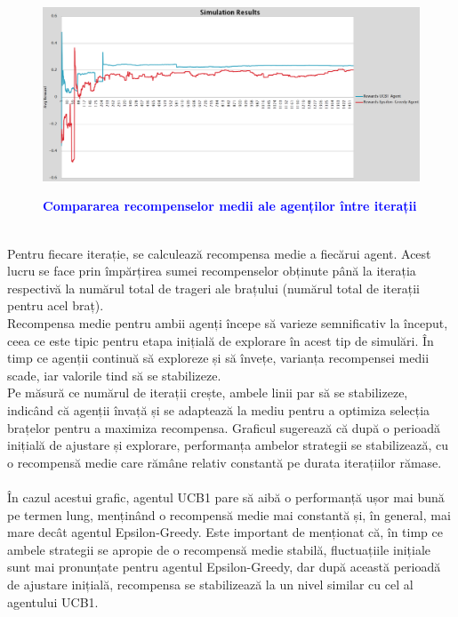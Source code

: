 \documentclass{article}
\begin{document}
\begin{figure}[h]
    \centering
    \includegraphics[width=1\linewidth]{simulation results.png}
    \bfseries\caption{\textbf{\textcolor{blue}{Compararea recompenselor medii ale agenților între iterații}}}
\end{figure}
\\Pentru fiecare iterație, se calculează recompensa medie a fiecărui agent. Acest lucru se face prin împărțirea sumei recompenselor obținute până la iterația respectivă la numărul total de trageri ale brațului (numărul total de iterații pentru acel braț).\\
Recompensa medie pentru ambii agenți începe să varieze semnificativ la început, ceea ce este tipic pentru etapa inițială de explorare în acest tip de simulări. În timp ce agenții continuă să exploreze și să învețe, varianța recompensei medii scade, iar valorile tind să se stabilizeze.\\
Pe măsură ce numărul de iterații crește, ambele linii par să se stabilizeze, indicând că agenții învață și se adaptează la mediu pentru a optimiza selecția brațelor pentru a maximiza recompensa.
Graficul sugerează că după o perioadă inițială de ajustare și explorare, performanța ambelor strategii se stabilizează, cu o recompensă medie care rămâne relativ constantă pe durata iterațiilor rămase. \\\\
În cazul acestui grafic, agentul UCB1 pare să aibă o performanță ușor mai bună pe termen lung, menținând o recompensă medie mai constantă și, în general, mai mare decât agentul Epsilon-Greedy.
Este important de menționat că, în timp ce ambele strategii se apropie de o recompensă medie stabilă, fluctuațiile inițiale sunt mai pronunțate pentru agentul Epsilon-Greedy, dar după această perioadă de ajustare inițială, recompensa se stabilizează la un nivel similar cu cel al agentului UCB1.\\ 
\end{document}
